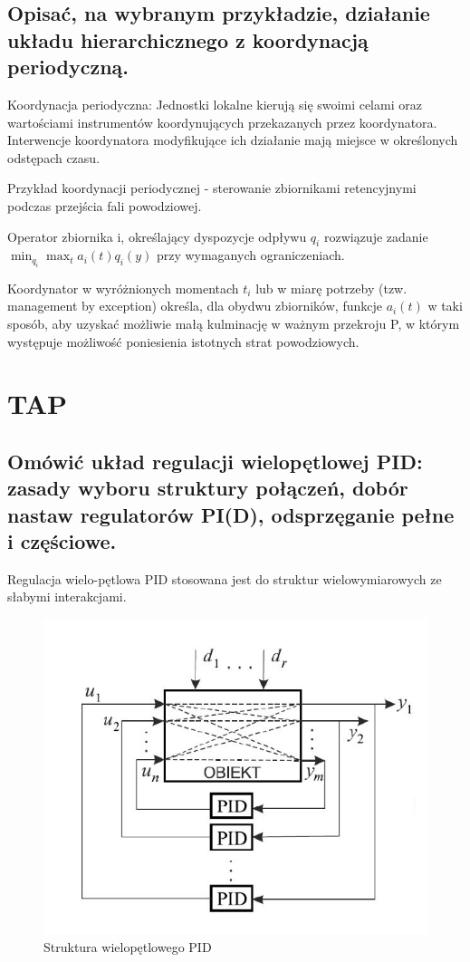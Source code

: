 \subsection{Opisać, na wybranym przykładzie, działanie układu hierarchicznego z koordynacją periodyczną.}
Koordynacja periodyczna: Jednostki lokalne kierują się swoimi celami oraz wartościami instrumentów koordynujących przekazanych przez koordynatora. Interwencje koordynatora modyfikujące ich działanie mają miejsce w określonych odstępach czasu.

Przykład koordynacji periodycznej - sterowanie zbiornikami retencyjnymi podczas przejścia fali powodziowej.

Operator zbiornika i, określający dyspozycje odpływu $q_i$ rozwiązuje zadanie $\min_{q_i} \max_t a_i(t)q_i(y)$ przy wymaganych ograniczeniach.

Koordynator w wyróżnionych momentach $t_i$ lub w miarę potrzeby (tzw. management by exception) określa, dla obydwu zbiorników, funkcje $a_i(t)$ w taki sposób, aby uzyskać możliwie małą kulminację w ważnym przekroju P, w którym występuje możliwość poniesienia istotnych strat powodziowych.


\section{TAP}
\subsection{Omówić układ regulacji wielopętlowej PID: zasady wyboru struktury połączeń, dobór nastaw regulatorów PI(D), odsprzęganie pełne i częściowe.}
Regulacja wielo-pętlowa PID stosowana jest do struktur wielowymiarowych ze słabymi interakcjami.


\begin{figure}[H]
\centering
\includegraphics[width=0.5\linewidth]{fig/Struktura wielopętlowego PID.png}
\caption{Struktura wielopętlowego PID}
\end{figure}

